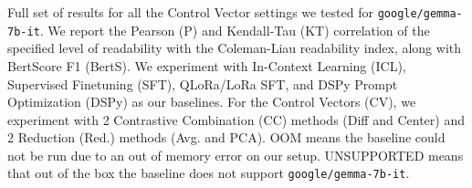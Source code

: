 \begin{table}[!ht]
\caption[Full set of results for all the Control Vector settings we tested for \texttt{google/gemma-7b-it}.]{Full set of results for all the Control Vector settings we tested for \texttt{google/gemma-7b-it}. We report the Pearson (P) and Kendall-Tau (KT) correlation of the specified level of readability with the Coleman-Liau readability index, along with BertScore F1 (BertS). We experiment with In-Context Learning (ICL), Supervised Finetuning (SFT), QLoRa/LoRa SFT, and DSPy Prompt Optimization (DSPy) as our baselines. For the Control Vectors (CV), we experiment with 2 Contrastive Combination (CC) methods (Diff and Center) and 2 Reduction (Red.) methods (Avg. and PCA). OOM means the baseline could not be run due to an out of memory error on our setup. UNSUPPORTED means that out of the box the baseline does not support \texttt{google/gemma-7b-it}.}
\label{tab:main-results-gemma}
\end{table}






